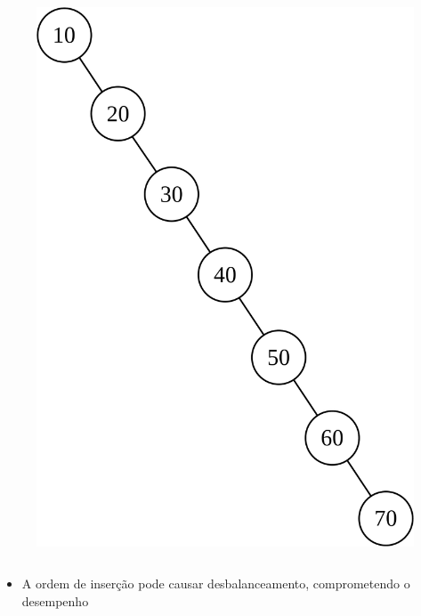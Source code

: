 \documentclass[aspectratio=169]{beamer}
\begin{document}
\begin{frame}
\begin{columns}[T]
\begin{column}{0.25\linewidth}
\begin{figure}[h]
	\includegraphics[height=0.5\paperheight]{imagens/avl05.png}
\end{figure}
\end{column}
\end{columns}
\pause
\begin{itemize}
	\item A ordem de inserção pode causar desbalanceamento, comprometendo o desempenho
\end{itemize}
\end{frame}
\end{document}
